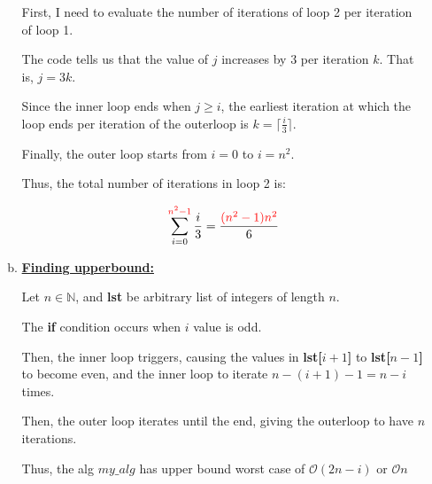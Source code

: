\documentclass[12pt]{article}
\begin{document}
\begin{enumerate}[1.]
\begin{enumerate}[a)]
\begin{mdframed}
            First, I need to evaluate the number of iterations of loop 2 per iteration of loop 1.

            \bigskip

            The code tells us that the value of $j$ increases by 3 per iteration $k$. That is, $j = 3k$.

            \bigskip

            Since the inner loop ends when $j \geq i$, the earliest iteration at which
            the loop ends per iteration of the outerloop is $k = \lceil \frac{i}{3} \rceil$.

            \bigskip

            Finally, the outer loop starts from $i = 0$ to $i = n^2$.

            \bigskip

            Thus, the total number of iterations in loop 2 is:

            \setcounter{equation}{0}
            \begin{align}
                \sum\limits_{i=0}^{\color{red}n^2-1\color{black}} \frac{i}{3} = \frac{\color{red}(n^2-1)n^2\color{black}}{6}
            \end{align}

            \bigskip

        \end{mdframed}

        \item

        \underline{\textbf{Finding upperbound:}}

        \bigskip

        Let $n \in \mathbb{N}$, and \textbf{lst} be arbitrary list of integers of length $n$.

        \bigskip

        The \textbf{if} condition occurs when $i$ value is odd.

        \bigskip

        Then, the inner loop triggers, causing the values in \textbf{lst[$i+1$]} to \textbf{lst[$n-1$]}
        to become even, and the inner loop to iterate $n - (i+1) - 1 = n - i$ times.

        \bigskip

        Then, the outer loop iterates until the end, giving the outerloop
        to have $n$ iterations.
        \bigskip

        Thus, the alg \textbf{$my\_alg$} has upper bound worst case of $\mathcal{O}(2n-i)$ or $\mathcal{O}{n}$


\end{enumerate}
\end{enumerate}
\end{document}
